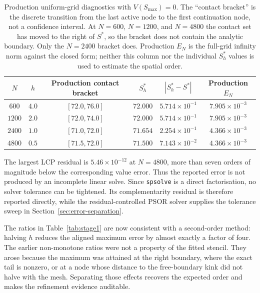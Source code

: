 \documentclass[11pt,a4paper]{article}
\theoremstyle{definition}
\theoremstyle{remark}
\begin{document}
\begin{table}[H]
\centering
\scriptsize
\setlength{\tabcolsep}{5pt}
\begin{tabular}{cccccc}
\toprule
\textbf{$N$} & \textbf{$h$} & \textbf{Production contact bracket} &
\textbf{$S_h^*$} & \textbf{$|S_h^*-S^*|$} & \textbf{Production $E_N$} \\
\midrule
$600$  & $4.0$ & $[72.0,76.0]$ & $72.000$ & $5.714\times10^{-1}$ &
$7.905\times10^{-3}$ \\
$1200$ & $2.0$ & $[72.0,74.0]$ & $72.000$ & $5.714\times10^{-1}$ &
$7.905\times10^{-3}$ \\
$2400$ & $1.0$ & $[71.0,72.0]$ & $71.654$ & $2.254\times10^{-1}$ &
$4.366\times10^{-3}$ \\
$4800$ & $0.5$ & $[71.5,72.0]$ & $71.500$ & $7.143\times10^{-2}$ &
$4.366\times10^{-3}$ \\
\bottomrule
\end{tabular}
\caption{Production uniform-grid diagnostics with $V(S_{\max})=0$. The
``contact bracket'' is the discrete transition from the last active node to
the first continuation node, not a confidence interval. At $N=600$,
$N=1200$, and $N=4800$ the contact set has moved to the right of $S^*$, so
the bracket does not contain the analytic boundary. Only the $N=2400$
bracket does.
Production $E_N$ is the full-grid infinity norm against the closed form;
neither this column nor the individual $S_h^*$ values is used to estimate the
spatial order.}
\label{tab:stage1-production}
\end{table}

The largest LCP residual is $5.46\times10^{-12}$ at $N=4800$, more than
seven orders of magnitude below the corresponding value error. Thus the
reported error is not produced by an incomplete linear solve. Since
\texttt{spsolve} is a direct factorisation, no solver tolerance can be
tightened. Its complementarity residual is therefore reported directly, while
the residual-controlled PSOR solver supplies the tolerance sweep in
Section~\ref{sec:error-separation}.

The ratios in Table~\ref{tab:stage1} are now consistent with a second-order
method: halving $h$ reduces the aligned maximum error by almost exactly a
factor of four. The earlier non-monotone ratios were not a property of the
fitted stencil. They arose because the maximum was attained at the right
boundary, where the exact tail is nonzero, or at a node whose distance to
the free-boundary kink did not halve with the mesh. Separating those effects
recovers the expected order and makes the refinement evidence auditable.
\end{document}
